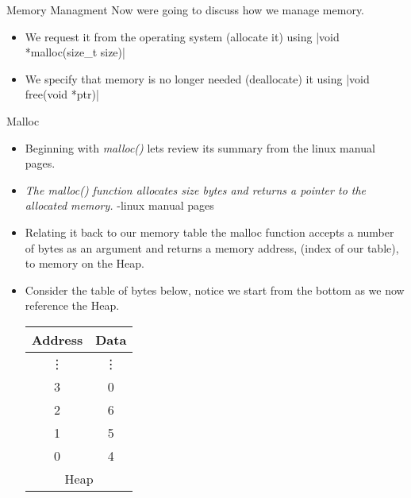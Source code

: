 \documentclass[10pt]{beamer}
\begin{document}
\begin{frame}[fragile]{Memory Managment} 
Now were going to discuss how we manage memory.
\begin{itemize}[<+->]
	\item We request it from the operating system (allocate it) using
	|void *malloc(size_t size)|
	\item We specify that memory is no longer needed (deallocate) it using
	|void free(void *ptr)|
\end{itemize}
\end{frame}

\begin{frame}[fragile]{Malloc} 
\begin{itemize}[<+->]
	\item Beginning with {\it malloc()} lets review its summary from the linux manual pages.
	\item {\it The malloc() function allocates size bytes and returns a pointer to the  allocated memory.} -linux manual pages
	\item Relating it back to our memory table the malloc function accepts a number of bytes as an argument and returns a memory address, (index of our table), to memory on the Heap. 
	\item Consider the table of bytes below, notice we start from the bottom as we now reference the Heap.

	\begin{tabular}{|c|c|}
		\hline
		Address & Data\\
		\hline
		\vdots & \vdots \\
		\hline
		3&	0\\
		\hline
		2&	6\\
		\hline
		1&	5\\
		\hline
		0 &	4\\
		\hline
		\multicolumn{2}{|c|}{Heap}\\
		\hline
	\end{tabular}

\end{itemize}
\end{frame}
\end{document}
